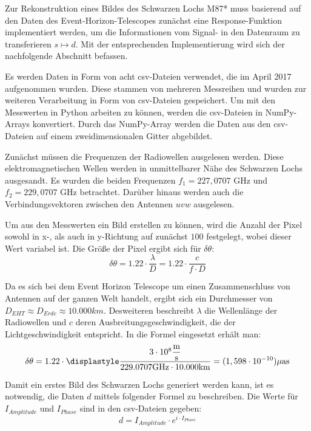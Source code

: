 \documentclass[]{dsadokumentation}
\begin{document}
Zur Rekonstruktion eines Bildes des Schwarzen Lochs M87* muss basierend auf den Daten des Event-Horizon-Telescopes zunächst eine Response-Funktion implementiert werden, um die Informationen vom Signal- in den Datenraum zu transferieren $s \mapsto d$. Mit der entsprechenden Implementierung wird sich der nachfolgende Abschnitt befassen.

Es werden Daten in Form von acht csv-Dateien verwendet, die im April 2017 aufgenommen wurden. Diese stammen von mehreren Messreihen und wurden zur weiteren Verarbeitung in Form von csv-Dateien gespeichert.
Um mit den Messwerten in Python arbeiten zu können, werden die csv-Dateien in NumPy-Arrays konvertiert. Durch das NumPy-Array werden die Daten aus den csv-Dateien auf einem zweidimensionalen Gitter abgebildet.

Zunächst müssen die Frequenzen der Radiowellen ausgelesen werden. Diese elektromagnetischen Wellen werden in unmittelbarer Nähe des Schwarzen Lochs ausgesandt. Es wurden die beiden Frequenzen $f_1 = 227,0707$ GHz und $f_2 = 229,0707$ GHz betrachtet. Darüber hinaus werden auch die Verbindungsvektoren zwischen den Antennen $uvw$ ausgelesen.

Um aus den Messwerten ein Bild erstellen zu können, wird die Anzahl der Pixel sowohl in x-, als auch in y-Richtung auf zunächst $100$ festgelegt, wobei dieser Wert variabel ist. Die Größe der Pixel ergibt sich für $\delta \theta$:
\[ \delta \theta = 1.22 \cdot \displaystyle\frac{\lambda}{D} = 1.22 \cdot \displaystyle\frac{c}{f \cdot D} \]

Da es sich bei dem Event Horizon Telescope um einen Zusammenschluss von Antennen auf der ganzen Welt handelt, ergibt sich ein Durchmesser von $D_{EHT} \approx D_{Erde} \approx 10.000km$. Desweiteren beschreibt $\lambda$ die Wellenlänge der Radiowellen und $c$ deren Ausbreitungsgeschwindigkeit, die der Lichtgeschwindigkeit entspricht. In die Formel eingesetzt erhält man:
\[ \delta \theta = 1.22 \cdot \displastyle\frac{3 \cdot 10^{8} \displaystyle\frac{\text{m}}{\text{s}}} {229.0707 \text{GHz} \cdot 10.000 \text{km}} = (1,598 \cdot 10^{-10}) \mu \text{as} \]

Damit ein erstes Bild des Schwarzen Lochs generiert werden kann, ist es notwendig, die Daten $d$ mittels folgender Formel zu beschreiben. Die Werte für $I_{Amplitude}$ und $I_{Phase}$ sind in den csv-Dateien gegeben:
\[ d = I_{Amplitude} \cdot e^{i \cdot I_{Phase}} \]
\end{document}
